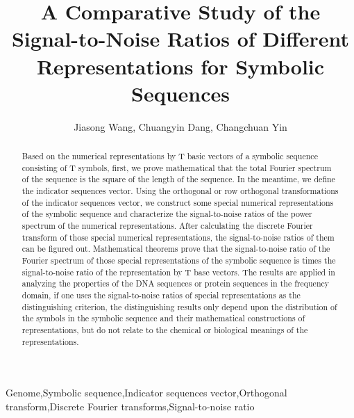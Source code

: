 \documentclass[preprint,authoryear,12pt]{elsarticle}
\begin{document}
\begin{frontmatter}

\title{A Comparative Study of the Signal-to-Noise Ratios of Different Representations for Symbolic Sequences}
\author{Jiasong Wang, Chuangyin Dang, Changchuan Yin}
\address{1.Department of Mathematics, Nanjing University, Nanjing 210093, China\\
2.Department of System Engineering and Engineering Management, City University of Hong Kong, Hong Kong\\
3.College of Natural Sciences, University of Phoenix, Chicago, IL 60173, USA\\
 Corresponding author, Email: cyinbox@email.phoenix.edu
}
\begin{abstract}
Based on the numerical representations by T basic vectors of a symbolic sequence consisting of T symbols, first, we prove mathematical that the total Fourier spectrum of the sequence is the square of the length of the sequence. In the meantime, we define the indicator sequences vector. Using the orthogonal or row orthogonal transformations of the indicator sequences vector, we construct some special numerical representations of the symbolic sequence and characterize the signal-to-noise ratios of the power spectrum of the numerical representations. After calculating the discrete Fourier transform of those special numerical representations, the signal-to-noise ratios of them can be figured out. Mathematical theorems prove that the signal-to-noise ratio of the Fourier spectrum of those special representations of the symbolic sequence is  times the signal-to-noise ratio of the representation by T base vectors. The results are applied in analyzing the properties of the DNA sequences or protein sequences in the frequency domain, if one uses the signal-to-noise ratios of special representations as the distinguishing criterion, the distinguishing results only depend upon the distribution of the symbols in the symbolic sequence and their mathematical constructions of representations, but do not relate to the chemical or biological meanings of the representations.
\end{abstract}
\begin{keyword}
Genome\sep Symbolic sequence\sep Indicator sequences vector\sep Orthogonal transform\sep Discrete Fourier transforms\sep Signal-to-noise ratio

\end{keyword}
\end{frontmatter}
\end{document}
